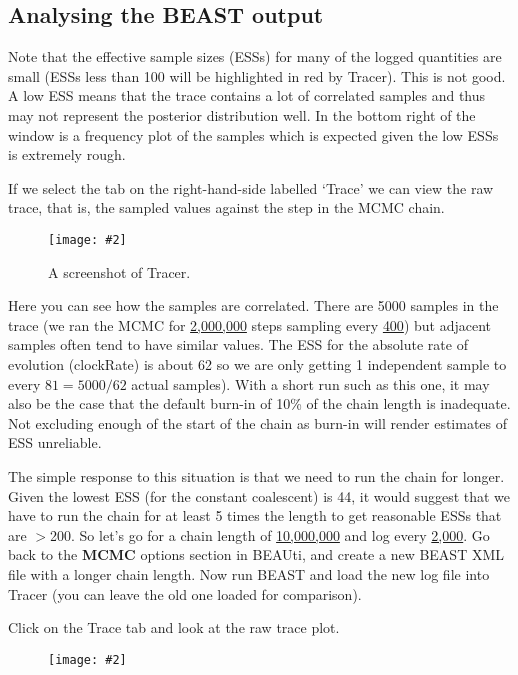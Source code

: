 \documentclass[12pt]{article}
\newcommand{\includeimage}[2][]{%
\texttt{[image: \#2]}
}
\newcommand{\chainLength}{{2,000,000}}
\newcommand{\logEvery}{{400}}
\newcommand{\chainLengthLong}{{10,000,000}}
\newcommand{\logEveryLong}{{2,000}}
\newcommand{\lowestESS}{{44}}
\begin{document}
\subsection*{Analysing the BEAST output}

Note that the effective sample sizes (ESSs) for many of the logged quantities are small (ESSs less than 100 will be highlighted in red by Tracer).
This is not good. A low ESS means that the trace contains a lot of correlated samples and thus may not represent the
posterior distribution well. In the bottom right of the window is a frequency plot of the samples which is expected given the
low ESSs is extremely rough.

If we select the tab on the right-hand-side labelled `Trace' we can view the raw trace, that is, the sampled values against the step in the MCMC chain.

\begin{figure}
\centering	
\includeimage[width=0.8\textwidth]{figures/Tracer1}
\label{fig:Tracer1}
\caption{A screenshot of Tracer.}
\end{figure}

Here you can see how the samples are correlated. There are 5000 samples in the trace (we ran the MCMC for \underline{\chainLength{}}
steps sampling every \underline{\logEvery{}}) but adjacent samples often tend to have similar values. The ESS for the absolute rate of evolution (clockRate) is about 62 so we are only getting 1 independent sample to every $81=5000/62$ actual samples). With a short run such as this one, it may also be the case that the default burn-in of 10\% of the chain length is inadequate. Not excluding enough of the start of the chain as burn-in will render estimates of ESS unreliable.

The simple response to this situation is that we need to run the chain for longer. Given the lowest ESS (for the constant coalescent) is \lowestESS{}, it
would suggest that we have to run the chain for at least 5 times the length to get reasonable ESSs that are $>$200. 
So let's go for a chain length of \underline{\chainLengthLong{}} and log every \underline{\logEveryLong{}}. Go back to the {\bf MCMC} options section in BEAUti, and create a new BEAST XML file with a longer chain length. Now run BEAST and load the new log file into Tracer (you can leave the old one loaded
for comparison). 

Click on the Trace tab and look at the raw trace plot.

\begin{figure}
\centering	
\includeimage[width=0.8\textwidth]{figures/Tracer2}
\label{fig:Tracer2}
\end{figure}
\end{document}
